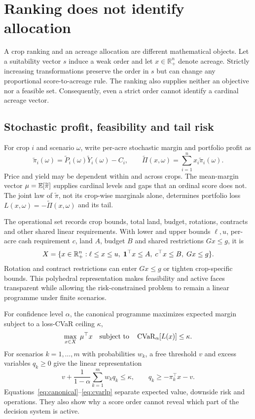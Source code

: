 \section{Ranking does not identify allocation}

A crop ranking and an acreage allocation are different mathematical objects. Let a suitability vector $s$ induce a weak order and let $x\in\mathbb{R}^n_+$ denote acreage. Strictly increasing transformations preserve the order in $s$ but can change any proportional score-to-acreage rule. The ranking also supplies neither an objective nor a feasible set. Consequently, even a strict order cannot identify a cardinal acreage vector.

\subsection{Stochastic profit, feasibility and tail risk}

For crop $i$ and scenario $\omega$, write per-acre stochastic margin and portfolio profit as
\begin{equation}
\widetilde\pi_i(\omega)=\widetilde P_i(\omega)\widetilde Y_i(\omega)-C_i,
\qquad
\widetilde\Pi(x,\omega)=\sum_{i=1}^n x_i\widetilde\pi_i(\omega).
\end{equation}
Price and yield may be dependent within and across crops. The mean-margin vector $\mu=\mathbb{E}[\widetilde\pi]$ supplies cardinal levels and gaps that an ordinal score does not. The joint law of $\widetilde\pi$, not its crop-wise marginals alone, determines portfolio loss $L(x,\omega)=-\widetilde\Pi(x,\omega)$ and its tail.

The operational set records crop bounds, total land, budget, rotations, contracts and other shared linear requirements. With lower and upper bounds $\ell,u$, per-acre cash requirement $c$, land $A$, budget $B$ and shared restrictions $Gx\leq g$, it is
\begin{equation}
X=\{x\in\mathbb{R}_+^n:\ell\leq x\leq u,\;\mathbf 1^\top x\leq A,\;c^\top x\leq B,\;Gx\leq g\}.
\end{equation}
Rotation and contract restrictions can enter $Gx\leq g$ or tighten crop-specific bounds. This polyhedral representation makes feasibility and active faces transparent while allowing the risk-constrained problem to remain a linear programme under finite scenarios.

For confidence level $\alpha$, the canonical programme maximizes expected margin subject to a loss-CVaR ceiling $\kappa$,
\begin{equation}
\max_{x\in X}\;\mu^\top x
\quad\text{subject to}\quad
\operatorname{CVaR}_{\alpha}[L(x)]\leq\kappa.
\label{eq:canonical}
\end{equation}
For scenarios $k=1,\ldots,m$ with probabilities $w_k$, a free threshold $v$ and excess variables $q_k\geq0$ give the linear representation
\begin{equation}
v+\frac{1}{1-\alpha}\sum_{k=1}^m w_kq_k\leq\kappa,
\qquad q_k\geq -\pi_k^\top x-v.
\label{eq:cvarlp}
\end{equation}
Equations~\ref{eq:canonical}--\ref{eq:cvarlp} separate expected value, downside risk and operations. They also show why a score order cannot reveal which part of the decision system is active.

